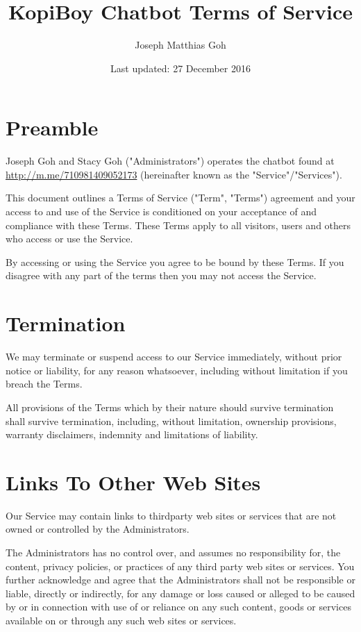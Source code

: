 \documentclass[11pt]{article}
\title{KopiBoy Chatbot Terms of Service}
\author{Joseph Matthias Goh}
\date{Last updated: 27 December 2016}           %
\begin{document}
\setlength{\parskip}{12pt}
\maketitle



\section{Preamble}

Joseph Goh and Stacy Goh ("Administrators") operates the chatbot found at 
\url{http://m.me/710981409052173} (hereinafter known as the "Service"/"Services").

This document outlines a Terms of Service ("Term", "Terms") agreement and your access to and use of the Service is 
conditioned on your acceptance of and compliance with these Terms. These Terms apply to all visitors, 
users and others who access or use the Service.

By accessing or using the Service you agree to be bound by these Terms. If you disagree with
any part of the terms then you may not access the Service.

\section{Termination}

We may terminate or suspend access to our Service immediately, without prior notice or liability,
for any reason whatsoever, including without limitation if you breach the Terms.

All provisions of the Terms which by their nature should survive termination shall survive
termination, including, without limitation, ownership provisions, warranty disclaimers, indemnity
and limitations of liability.

\section{Links To Other Web Sites}

Our Service may contain links to third­party web sites or services that are not owned or controlled
by the Administrators.

The Administrators has no control over, and assumes no responsibility for, the
content, privacy policies, or practices of any third party web sites or services. You further
acknowledge and agree that the Administrators shall not be responsible or liable,
directly or indirectly, for any damage or loss caused or alleged to be caused by or in connection
with use of or reliance on any such content, goods or services available on or through any such
web sites or services.
\end{document}

